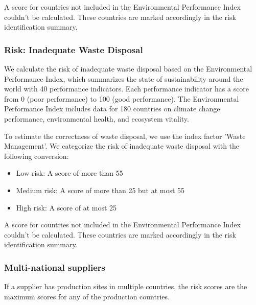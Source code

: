 \documentclass{article}
\begin{document}
A score for countries not included in the Environmental Performance Index couldn't be calculated. These countries are marked accordingly in the risk identification summary.

\subsubsection*{Risk: Inadequate Waste Disposal}

We calculate the risk of inadequate waste disposal based on the Environmental Performance Index, which summarizes the state of sustainability around the world with
40 performance indicators. Each performance indicator has a score from 0 (poor performance) to 100 (good performance). The Environmental Performance Index includes data
for 180 countries on climate change performance, environmental health, and ecosystem vitality.

To estimate the correctness of waste disposal, we use the index factor 'Waste Management'. We categorize the risk of inadequate waste disposal with the following conversion:
\begin{itemize}
    \item Low risk: A score of more than 55
    \item Medium risk: A score of more than 25 but at most 55
    \item High risk: A score of at most 25
\end{itemize}

A score for countries not included in the Environmental Performance Index couldn't be calculated. These countries are marked accordingly in the risk identification summary.

\subsubsection*{Multi-national suppliers}

If a supplier has production sites in multiple countries, the risk scores are the maximum scores for any of the production countries. 
\end{document}
